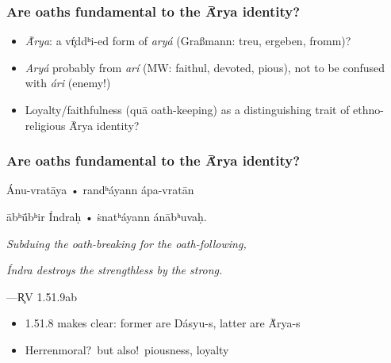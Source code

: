 \documentclass[pdf]{beamer}
\begin{document}
\begin{frame} \frametitle{Are oaths fundamental to the Ā́rya identity?}
\begin{itemize}
	\item \textit{Ā́rya}: a vŕ̥ddʰi-ed form of \textit{aryá} (Graßmann: treu, ergeben, fromm)?
	\pause \item \textit{Aryá} probably from \textit{arí} (MW: faithul, devoted, pious), not to be confused with \textit{ári} (enemy!)
	\pause \item Loyalty/faithfulness (quā oath-keeping) as a distinguishing trait of ethno-religious Ā́rya identity?
\end{itemize}
\end{frame}

\begin{frame} \frametitle{Are oaths fundamental to the Ā́rya identity?}
\begin{center}
	Ánu-vratāya • randʰáyann ápa-vratān

	ābʰū́bʰir Índraḥ • ṡnatʰáyann ánābʰuvaḥ.

	\vspace{12pt}

	\textit{Subduing the oath-breaking for the oath-following,}

	\textit{Índra destroys the strengthless by the strong.}

	\vspace{12pt}

 	---R̥V 1.51.9ab
\end{center}

\begin{itemize}
	\item 1.51.8 makes clear: former are Dásyu-s, latter are Ā́rya-s
	\item Herrenmoral?~but also!~piousness, loyalty
\end{itemize}
\end{frame}
\end{document}
